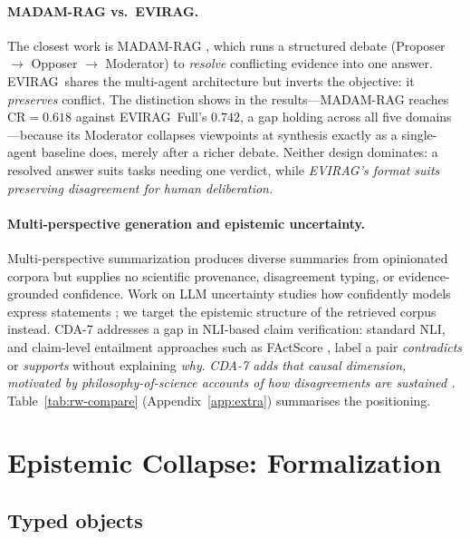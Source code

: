 \documentclass[11pt]{article}
\newcommand{\system}{\textsc{EVIRAG}\xspace}
\begin{document}
\paragraph{MADAM-RAG vs.\ \system.}
The closest work is MADAM-RAG \citep{wang2025conflicting}, which runs a
structured debate (Proposer $\to$ Opposer $\to$ Moderator) to \emph{resolve}
conflicting evidence into one answer.  \system\ shares the multi-agent
architecture but inverts the objective: it \emph{preserves} conflict.  The
distinction shows in the results---MADAM-RAG reaches CR$=0.618$ against
\system\ Full's $0.742$, a gap holding across all five domains---because its
Moderator collapses viewpoints at synthesis exactly as a single-agent baseline
does, merely after a richer debate.  Neither design dominates: a resolved
answer suits tasks needing one verdict, while \textit{\textup{\system}'s format
suits preserving disagreement for human deliberation.}

\paragraph{Multi-perspective generation and epistemic uncertainty.}
Multi-perspective summarization produces diverse summaries from opinionated
corpora \citep{bravzinskas2020few,hayashi2021wikiasp} but supplies no scientific
provenance, disagreement typing, or evidence-grounded confidence.  Work on LLM
uncertainty studies how confidently models express statements
\citep{xiong2024llms,kadavath2022language}; we target the epistemic structure
of the retrieved corpus instead.  CDA-7 addresses a gap in NLI-based claim
verification: standard NLI, and claim-level entailment approaches such as
FActScore \citep{min2023factscore}, label a pair \emph{contradicts} or
\emph{supports} without explaining \emph{why}.  \textit{CDA-7 adds that causal
dimension, motivated by philosophy-of-science accounts of how disagreements are
sustained \citep{longino2002science,solomon2001social}.}
Table~\ref{tab:rw-compare} (Appendix~\ref{app:extra}) summarises the positioning.


\section{Epistemic Collapse: Formalization}
\label{sec:formalization}

\subsection{Typed objects}
\label{sec:types}
\end{document}
